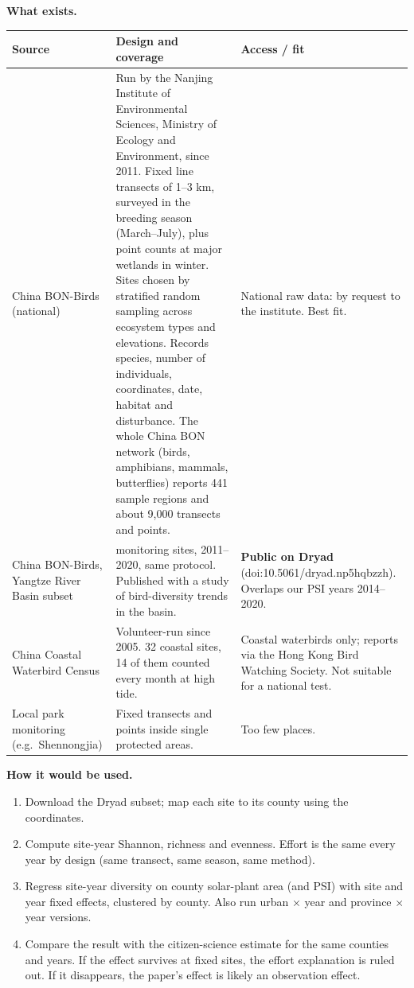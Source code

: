 \documentclass[11pt]{article}
\begin{document}
\textbf{What exists.}
\begin{center}
\small
\begin{tabularx}{\linewidth}{>{\raggedright\arraybackslash}p{3.1cm} >{\raggedright\arraybackslash}X >{\raggedright\arraybackslash}p{3.3cm}}
\toprule
\textbf{Source} & \textbf{Design and coverage} & \textbf{Access / fit} \\
\midrule
China BON-Birds (national) & Run by the Nanjing Institute of Environmental Sciences, Ministry of Ecology and Environment, since 2011. Fixed line transects of 1--3 km, surveyed in the breeding season (March--July), plus point counts at major wetlands in winter. Sites chosen by stratified random sampling across ecosystem types and elevations. Records species, number of individuals, coordinates, date, habitat and disturbance. The whole China BON network (birds, amphibians, mammals, butterflies) reports 441 sample regions and about 9,000 transects and points. & National raw data: by request to the institute. Best fit. \\
\addlinespace
China BON-Birds, Yangtze River Basin subset & 536 monitoring sites, 2011--2020, same protocol. Published with a study of bird-diversity trends in the basin. & \textbf{Public on Dryad} (doi:10.5061/\allowbreak dryad.\allowbreak np5hqbzzh). Overlaps our PSI years 2014--2020. \\
\addlinespace
China Coastal Waterbird Census & Volunteer-run since 2005. 32 coastal sites, 14 of them counted every month at high tide. & Coastal waterbirds only; reports via the Hong Kong Bird Watching Society. Not suitable for a national test. \\
\addlinespace
Local park monitoring (e.g.\ Shennongjia) & Fixed transects and points inside single protected areas. & Too few places. \\
\bottomrule
\end{tabularx}
\end{center}

\textbf{How it would be used.}
\begin{enumerate}[leftmargin=18pt,itemsep=1pt]
\item Download the Dryad subset; map each site to its county using the coordinates.
\item Compute site-year Shannon, richness and evenness. Effort is the same every year by design (same transect, same season, same method).
\item Regress site-year diversity on county solar-plant area (and PSI) with site and year fixed effects, clustered by county. Also run urban $\times$ year and province $\times$ year versions.
\item Compare the result with the citizen-science estimate for the same counties and years. If the effect survives at fixed sites, the effort explanation is ruled out. If it disappears, the paper's effect is likely an observation effect.
\end{enumerate}
\end{document}
